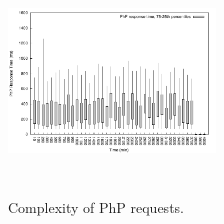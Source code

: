 \begin{figure}
\begin{center}
\includegraphics[width=0.49\textwidth, height=6cm]{./images/phpRespTimeDispersion2011}
\end{center}
\vspace{-5mm}
\caption{Complexity of PhP requests.}
\label{phpRespTimeDispersion}
\end{figure}









